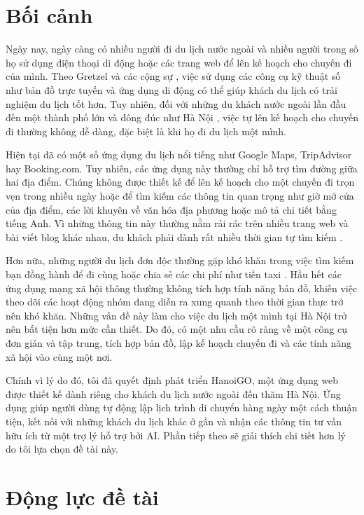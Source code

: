 \documentclass[a4paper,12pt]{report}
\begin{document}
\section{Bối cảnh}

Ngày nay, ngày càng có nhiều người đi du lịch nước ngoài và nhiều người trong số họ sử dụng điện thoại di động hoặc các trang web để lên kế hoạch cho chuyến đi của mình. Theo Gretzel và các cộng sự \cite{gretzel2015smart}, việc sử dụng các công cụ kỹ thuật số như bản đồ trực tuyến và ứng dụng di động có thể giúp khách du lịch có trải nghiệm du lịch tốt hơn. Tuy nhiên, đối với những du khách nước ngoài lần đầu đến một thành phố lớn và đông đúc như Hà Nội \cite{vietnamtourism2024}, việc tự lên kế hoạch cho chuyến đi thường không dễ dàng, đặc biệt là khi họ đi du lịch một mình.

Hiện tại đã có một số ứng dụng du lịch nổi tiếng như Google Maps, TripAdvisor hay Booking.com. Tuy nhiên, các ứng dụng này thường chỉ hỗ trợ tìm đường giữa hai địa điểm. Chúng không được thiết kế để lên kế hoạch cho một chuyến đi trọn vẹn trong nhiều ngày hoặc để tìm kiếm các thông tin quan trọng như giờ mở cửa của địa điểm, các lời khuyên về văn hóa địa phương hoặc mô tả chi tiết bằng tiếng Anh. Vì những thông tin này thường nằm rải rác trên nhiều trang web và bài viết blog khác nhau, du khách phải dành rất nhiều thời gian tự tìm kiếm \cite{buhalis2020smartness}.

Hơn nữa, những người du lịch đơn độc thường gặp khó khăn trong việc tìm kiếm bạn đồng hành để đi cùng hoặc chia sẻ các chi phí như tiền taxi \cite{buhalis2019cocreation}. Hầu hết các ứng dụng mạng xã hội thông thường không tích hợp tính năng bản đồ, khiến việc theo dõi các hoạt động nhóm đang diễn ra xung quanh theo thời gian thực trở nên khó khăn. Những vấn đề này làm cho việc du lịch một mình tại Hà Nội trở nên bất tiện hơn mức cần thiết. Do đó, có một nhu cầu rõ ràng về một công cụ đơn giản và tập trung, tích hợp bản đồ, lập kế hoạch chuyến đi và các tính năng xã hội vào cùng một nơi.

Chính vì lý do đó, tôi đã quyết định phát triển HanoiGO, một ứng dụng web được thiết kế dành riêng cho khách du lịch nước ngoài đến thăm Hà Nội. Ứng dụng giúp người dùng tự động lập lịch trình di chuyển hàng ngày một cách thuận tiện, kết nối với những khách du lịch khác ở gần và nhận các thông tin tư vấn hữu ích từ một trợ lý hỗ trợ bởi AI. Phần tiếp theo sẽ giải thích chi tiết hơn lý do tôi lựa chọn đề tài này.

\section{Động lực đề tài}
\end{document}
